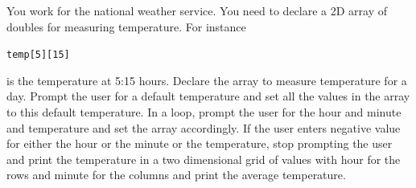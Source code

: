 \begin{ex}
You work for the national weather service. You need to declare a 2D array of doubles for measuring temperature. For instance

\verb!temp[5][15]!

is the temperature at 5:15 hours. Declare the array to measure temperature for a day. Prompt the user for a default temperature and set all the values in the array to this default temperature. In a loop, prompt the user for the hour and minute and temperature and set the array accordingly. If the user enters negative value for either the hour or the minute or the temperature, stop prompting the user and print the temperature in a two dimensional grid of values with hour for the rows and minute for the columns and print the average temperature.
\end{ex}
